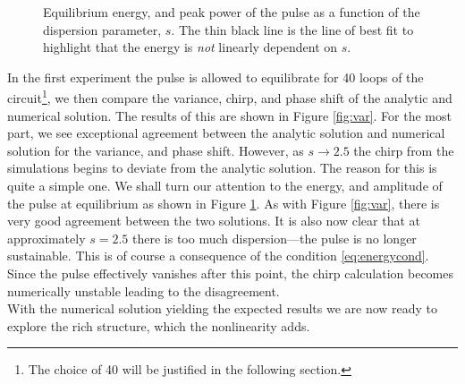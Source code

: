 \begin{figure}[tbp]
\centering

\caption[Equilibrium energy, and peak power of the pulse as a function of the dispersion parameter.]{Equilibrium energy, and peak power of the pulse as a function of the dispersion parameter, $s$. The thin black line is the line of best fit to highlight that the energy is \emph{not} linearly dependent on $s$.}
\label{fig:valenergy}
\end{figure}

In the first experiment the pulse is allowed to equilibrate for 40 loops of the circuit\footnote{The choice of 40 will be justified in the following section.}, we then compare the variance, chirp, and phase shift of the analytic and numerical solution. The results of this are shown in Figure \ref{fig:var}. For the most part, we see exceptional agreement between the analytic solution and numerical solution for the variance, and phase shift. However, as $s \rightarrow 2.5$ the chirp from the simulations begins to deviate from the analytic solution. The reason for this is quite a simple one. We shall turn our attention to the energy, and amplitude of the pulse at equilibrium as shown in Figure \ref{fig:valenergy}. As with Figure \ref{fig:var}, there is very good agreement between the two solutions. It is also now clear that at approximately $s = 2.5$ there is too much dispersion---the pulse is no longer sustainable. This is of course a consequence of the condition \eqref{eq:energycond}. Since the pulse effectively vanishes after this point, the chirp calculation becomes numerically unstable leading to the disagreement. \\

With the numerical solution yielding the expected results we are now ready to explore the rich structure, which the nonlinearity adds.

